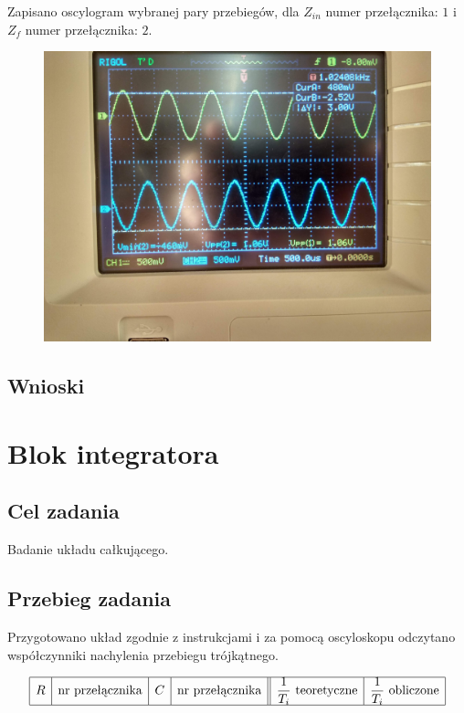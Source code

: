 \documentclass[polish,polish,a4paper]{article}
\begin{document}
\begin{spacing}{1.3}
Zapisano oscylogram wybranej pary przebiegów, dla $Z_{in}$ numer przełącznika: $1$ i $Z_{f}$ numer przełącznika: $2$.

\begin{figure}[H]
	\centering
	\includegraphics[scale=0.1]{141.jpg}
\end{figure}

\subsection{Wnioski}

\section{Blok integratora} %

\subsection{Cel zadania}

Badanie układu całkującego.

\subsection{Przebieg zadania}

Przygotowano układ zgodnie z instrukcjami i za pomocą oscyloskopu odczytano współczynniki nachylenia przebiegu trójkątnego.

\begin{spacing}{2}
\begin{equation*}
\begin{array}{|r|r|r|r||r|r|}
\hline
\multicolumn{1}{|c|}{R}&\multicolumn{1}{c|}{$nr przełącznika$}&\multicolumn{1}{c|}{C}&\multicolumn{1}{c||}{$nr przełącznika$}&
\multicolumn{1}{c|}{\dfrac{1}{T_{i}}$ teoretyczne$}&\multicolumn{1}{c|}{\dfrac{1}{T_{i}}$ obliczone$}\\
\hline


\end{array}
\end{equation*}
\end{spacing}
\end{spacing}
\end{document}
